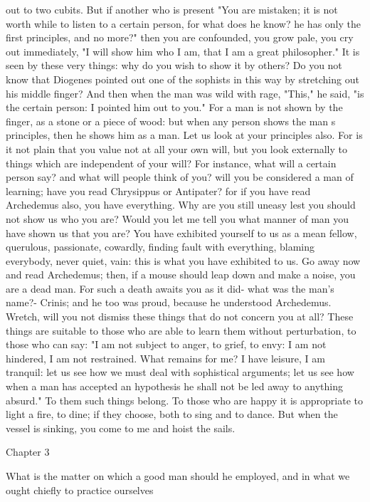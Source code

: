 \documentclass[a4paper]{article}
\begin{document}
out to two cubits. But if another who is present "You are mistaken; it is not
worth while to listen to a certain person, for what does he know? he has only
the first principles, and no more?" then you are confounded, you grow pale, you
cry out immediately, "I will show him who I am, that I am a great philosopher."
It is seen by these very things: why do you wish to show it by others? Do you
not know that Diogenes pointed out one of the sophists in this way by
stretching out his middle finger? And then when the man was wild with rage,
"This," he said, "is the certain person: I pointed him out to you." For a man
is not shown by the finger, as a stone or a piece of wood: but when any person
shows the man s principles, then he shows him as a man.
    Let us look at your principles also. For is it not plain that you value not
at all your own will, but you look externally to things which are independent
of your will? For instance, what will a certain person say? and what will
people think of you? will you be considered a man of learning; have you read
Chrysippus or Antipater? for if you have read Archedemus also, you have
everything. Why are you still uneasy lest you should not show us who you are?
Would you let me tell you what manner of man you have shown us that you are?
You have exhibited yourself to us as a mean fellow, querulous, passionate,
cowardly, finding fault with everything, blaming everybody, never quiet, vain:
this is what you have exhibited to us. Go away now and read Archedemus; then,
if a mouse should leap down and make a noise, you are a dead man. For such a
death awaits you as it did- what was the man's name?- Crinis; and he too was
proud, because he understood Archedemus.
    Wretch, will you not dismiss these things that do not concern you at all?
These things are suitable to those who are able to learn them without
perturbation, to those who can say: "I am not subject to anger, to grief, to
envy: I am not hindered, I am not restrained. What remains for me? I have
leisure, I am tranquil: let us see how we must deal with sophistical arguments;
let us see how when a man has accepted an hypothesis he shall not be led away
to anything absurd." To them such things belong. To those who are happy it is
appropriate to light a fire, to dine; if they choose, both to sing and to
dance. But when the vessel is sinking, you come to me and hoist the sails.

Chapter 3

What is the matter on which a good man should he employed, and in what we ought
                         chiefly to practice ourselves
\end{document}
